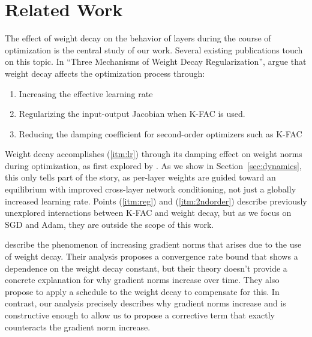 \documentclass[]{fairmeta}
\begin{document}

\section{Related Work}
The effect of weight decay on the behavior of layers during the course of optimization is the central study of our work. Several existing publications touch on this topic. In ``Three Mechanisms of Weight Decay Regularization'', \citet{zhang2018three} argue that weight decay affects the optimization process through:
\begin{enumerate}
    \item \label{itm:lr} Increasing the effective learning rate
    \item \label{itm:reg} Regularizing the input-output Jacobian when K-FAC is used.
    \item \label{itm:2ndorder} Reducing the damping coefficient for second-order optimizers such as K-FAC
\end{enumerate}
Weight decay accomplishes (\ref{itm:lr}) through its damping effect on weight norms during optimization, as first explored by \citet{van2017l2}. As we show in Section~\ref{sec:dynamics}, this only tells part of the story, as per-layer weights are guided toward an equilibrium with improved cross-layer network conditioning, not just a globally increased learning rate. Points (\ref{itm:reg}) and (\ref{itm:2ndorder}) describe previously unexplored interactions between K-FAC and weight decay, but as we focus on SGD and Adam, they are outside the scope of this work.

\citet{xie2023on} describe the phenomenon of increasing gradient norms that arises due to the use of weight decay. Their analysis proposes a convergence rate bound that shows a dependence on the weight decay constant, but their theory doesn't provide a concrete explanation for why gradient norms increase over time. They also propose to apply a schedule to the weight decay to compensate for this. In contrast, our analysis precisely describes why gradient norms increase and is constructive enough to allow us to propose a corrective term that exactly counteracts the gradient norm increase.
\end{document}
